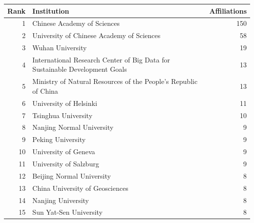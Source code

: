 \begin{tabular}{rlr}
\toprule
Rank & Institution & Affiliations \\
\midrule
1 & Chinese Academy of Sciences & 150 \\
2 & University of Chinese Academy of Sciences & 58 \\
3 & Wuhan University & 19 \\
4 & International Research Center of Big Data for Sustainable Development Goals & 13 \\
5 & Ministry of Natural Resources of the People's Republic of China & 13 \\
6 & University of Helsinki & 11 \\
7 & Tsinghua University & 10 \\
8 & Nanjing Normal University & 9 \\
9 & Peking University & 9 \\
10 & University of Geneva & 9 \\
11 & University of Salzburg & 9 \\
12 & Beijing Normal University & 8 \\
13 & China University of Geosciences & 8 \\
14 & Nanjing University & 8 \\
15 & Sun Yat-Sen University & 8 \\
\bottomrule
\end{tabular}

